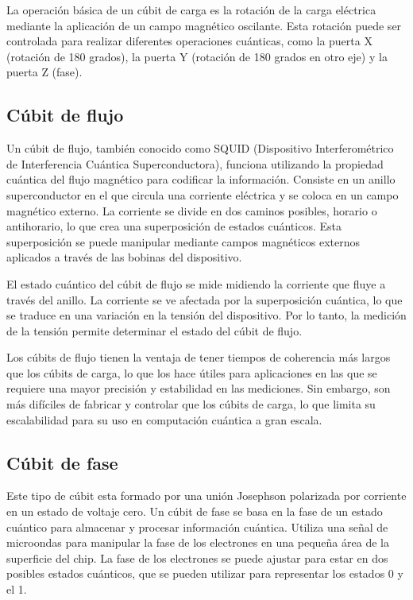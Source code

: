 \documentclass[12pt]{article}
\begin{document}
La operación básica de un cúbit de carga es la rotación de la carga eléctrica mediante la aplicación de un campo magnético oscilante. Esta rotación puede ser controlada para realizar diferentes operaciones cuánticas, como la puerta X (rotación de 180 grados), la puerta Y (rotación de 180 grados en otro eje) y la puerta Z (fase). 
%
\subsection{Cúbit de flujo}

Un cúbit de flujo, también conocido como SQUID (Dispositivo Interferométrico de Interferencia Cuántica Superconductora), funciona utilizando la propiedad cuántica del flujo magnético para codificar la información. Consiste en un anillo superconductor en el que circula una corriente eléctrica y se coloca en un campo magnético externo. La corriente se divide en dos caminos posibles, horario o antihorario, lo que crea una superposición de estados cuánticos. Esta superposición se puede manipular mediante campos magnéticos externos aplicados a través de las bobinas del dispositivo.

El estado cuántico del cúbit de flujo se mide midiendo la corriente que fluye a través del anillo. La corriente se ve afectada por la superposición cuántica, lo que se traduce en una variación en la tensión del dispositivo. Por lo tanto, la medición de la tensión permite determinar el estado del cúbit de flujo.

Los cúbits de flujo tienen la ventaja de tener tiempos de coherencia más largos que los cúbits de carga, lo que los hace útiles para aplicaciones en las que se requiere una mayor precisión y estabilidad en las mediciones. Sin embargo, son más difíciles de fabricar y controlar que los cúbits de carga, lo que limita su escalabilidad para su uso en computación cuántica a gran escala.
%
\subsection{Cúbit de fase}
Este tipo de cúbit esta formado por una unión Josephson polarizada por corriente en un estado de voltaje cero. Un cúbit de fase se basa en la fase de un estado cuántico para almacenar y procesar información cuántica. Utiliza una señal de microondas para manipular la fase de los electrones en una pequeña área de la superficie del chip. La fase de los electrones se puede ajustar para estar en dos posibles estados cuánticos, que se pueden utilizar para representar los estados 0 y el 1.
\end{document}
